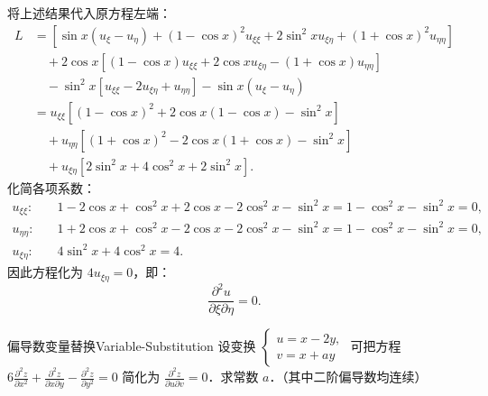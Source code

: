 \begin{myproof}
    将上述结果代入原方程左端：
    \begin{equation}
        \begin{aligned}
            L & = \left[ \sin x (u_\xi - u_\eta) + (1 - \cos x)^2 u_{\xi\xi} + 2\sin^2 x u_{\xi\eta} + (1 + \cos x)^2 u_{\eta\eta} \right] \\
              & \quad + 2\cos x \left[ (1 - \cos x) u_{\xi\xi} + 2\cos x u_{\xi\eta} - (1 + \cos x) u_{\eta\eta} \right]                   \\
              & \quad - \sin^2 x \left[ u_{\xi\xi} - 2u_{\xi\eta} + u_{\eta\eta} \right] - \sin x (u_\xi - u_\eta)                         \\
              & = u_{\xi\xi} \left[ (1 - \cos x)^2 + 2\cos x (1 - \cos x) - \sin^2 x \right]                                               \\
              & \quad + u_{\eta\eta} \left[ (1 + \cos x)^2 - 2\cos x (1 + \cos x) - \sin^2 x \right]                                       \\
              & \quad + u_{\xi\eta} \left[ 2\sin^2 x + 4\cos^2 x + 2\sin^2 x \right].
        \end{aligned}
    \end{equation}
    化简各项系数：
    \begin{equation}
        \begin{aligned}
            u_{\xi\xi}: \quad   & 1 - 2\cos x + \cos^2 x + 2\cos x - 2\cos^2 x - \sin^2 x = 1 - \cos^2 x - \sin^2 x = 0, \\
            u_{\eta\eta}: \quad & 1 + 2\cos x + \cos^2 x - 2\cos x - 2\cos^2 x - \sin^2 x = 1 - \cos^2 x - \sin^2 x = 0, \\
            u_{\xi\eta}: \quad  & 4\sin^2 x + 4\cos^2 x = 4.
        \end{aligned}
    \end{equation}
    因此方程化为 $4 u_{\xi\eta} = 0$，即：
    \begin{equation}
        \frac{\partial^2 u}{\partial \xi \partial \eta} = 0.
    \end{equation}
\end{myproof}


\begin{problem}{偏导数变量替换}{Variable-Substitution}
    设变换 $\begin{cases} u = x - 2y, \\ v = x + ay \end{cases}$ 可把方程 $6 \frac{\partial^2 z}{\partial x^2} + \frac{\partial^2 z}{\partial x \partial y} - \frac{\partial^2 z}{\partial y^2} = 0$ 简化为 $\frac{\partial^2 z}{\partial u \partial v} = 0$．求常数 $a$．（其中二阶偏导数均连续）
\end{problem}


